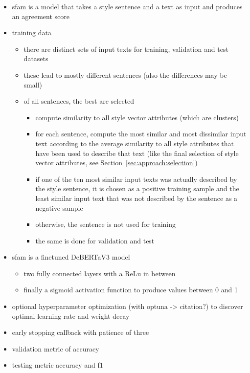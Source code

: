 \begin{itemize}
  \item \ac{sfam} is a model that takes a style sentence and a text as input and produces an agreement score
  \item training data
        \begin{itemize}
          \item there are distinct sets of input texts for training, validation and test datasets
          \item these lead to mostly different sentences (also the differences may be small)
          \item of all sentences, the best are selected
                \begin{itemize}
                  \item compute similarity to all style vector attributes (which are clusters)
                  \item for each sentence, compute the most similar and most dissimilar input text according to the average similarity to all style attributes that have been used to describe that text (like the final selection of style vector attributes, see Section~\ref{sec:approach:selection}) %
                  \item if one of the ten most similar input texts was actually described by the style sentence, it is chosen as a positive training sample and the least similar input text that was not described by the sentence as a negative sample
                  \item otherwise, the sentence is not used for training
                  \item the same is done for validation and test
                \end{itemize}
        \end{itemize}
  \item \ac{sfam} is a finetuned DeBERTaV3 model
        \begin{itemize}
          \item two fully connected layers with a ReLu in between %
          \item finally a sigmoid activation function to produce values between 0 and 1
        \end{itemize}
  \item optional hyperparameter optimization (with optuna -> citation?) to discover optimal learning rate and weight decay
  \item early stopping callback with patience of three
  \item validation metric of accuracy
  \item testing metric accuracy and f1
\end{itemize}


